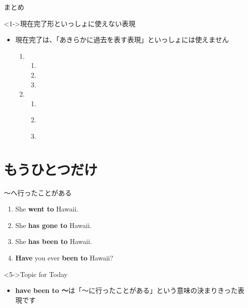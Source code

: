 \documentclass[aspectratio=169,xcolor={dvipsnames,table}]{beamer}
\begin{document}
\begin{frame}[plain]{まとめ}
  \begin{exampleblock}<1->{現在完了形といっしょに使えない表現}
\small

\begin{itemize}
 \item {現在完了は、「あきらかに過去を表す表現」といっしょには使えません\textdbend}
       \begin{enumerate}
	\item \begin{enumerate}
	       \item {}
	       \item {}
	       \item {}
	      \end{enumerate}
	\item \begin{enumerate}
	       \item {}
	       \item {}\\
	       \item {}
	      \end{enumerate}
       \end{enumerate}
\end{itemize}

\end{exampleblock}

\end{frame}
\section{もうひとつだけ}\begin{frame}[plain]{～へ行ったことがある}

\begin{enumerate}
 \item<1-> She \textbf{went to} Hawaii.
 \item<2-> She \textbf{has gone to} Hawaii.
 \item<3-> She \textbf{has been to} Hawaii.
 \item<4-> \textbf{Have} you ever \textbf{been to} Hawaii?
\end{enumerate}

\vfill

\begin{block}<5->{Topic for Today}
\begin{itemize}[square]\small
 \item \textbf{have been to ～}は「～に行ったことがある」という意味の決まりきった表現です
\end{itemize}
\end{block}
\end{frame}
\end{document}
